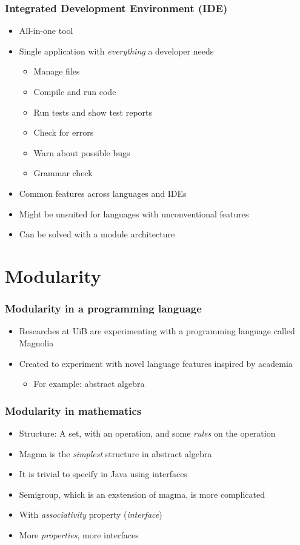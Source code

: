 \begin{frame}
  \frametitle{Integrated Development Environment (IDE)}
  \begin{itemize}
    \item All-in-one tool
    \item Single application with \textit{everything} a developer needs
      \begin{itemize}
        \item Manage files
        \item Compile and run code
        \item Run tests and show test reports
        \item Check for errors
        \item Warn about possible bugs
        \item Grammar check
      \end{itemize}
    \item Common features across languages and IDEs
    \item Might be unsuited for languages with unconventional features
    \item Can be solved with a module architecture
  \end{itemize}
\end{frame}

\section{Modularity}
\SectionPage

\begin{frame}
  \frametitle{Modularity in a programming language}
  \begin{itemize}
    \item Researches at UiB are experimenting with a programming language
    called Magnolia
    \item Created to experiment with novel language features inspired by
    academia
      \begin{itemize}
        \item For example: abstract algebra
      \end{itemize}
  \end{itemize}
\end{frame}

\begin{frame}
  \frametitle{Modularity in mathematics}
  \begin{itemize}
    \item Structure: A set, with an operation, and some \textit{rules} on the
    operation
    \item Magma is the \textit{simplest} structure in abstract algebra
    \item It is trivial to specify in Java using interfaces
    \item Semigroup, which is an exstension of magma, is more complicated
    \item With \textit{associativity} property (\textit{interface})
    \item More \textit{properties}, more interfaces
  \end{itemize}
\end{frame}

